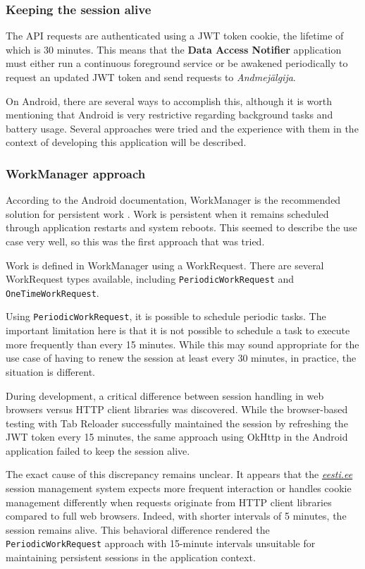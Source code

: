 \subsubsection{Keeping the session alive}
The API requests are authenticated using a JWT token cookie, the lifetime of which is 30 minutes. This means that the \textbf{Data Access Notifier} application must either run a continuous foreground service or be awakened periodically to request an updated JWT token and send requests to \textit{Andmejälgija}.

On Android, there are several ways to accomplish this, although it is worth mentioning that Android is very restrictive regarding background tasks and battery usage. Several approaches were tried and the experience with them in the context of developing this application will be described.

\subsubsection{WorkManager approach}
According to the Android documentation, WorkManager is the recommended solution for persistent work \cite{android-persistent-work}. Work is persistent when it remains scheduled through application restarts and system reboots. This seemed to describe the use case very well, so this was the first approach that was tried.

Work is defined in WorkManager using a WorkRequest. There are several WorkRequest types available, including \texttt{PeriodicWorkRequest} and \texttt{OneTimeWorkRequest}.

Using \texttt{PeriodicWorkRequest}, it is possible to schedule periodic tasks. The important limitation here is that it is not possible to schedule a task to execute more frequently than every 15 minutes. While this may sound appropriate for the use case of having to renew the session at least every 30 minutes, in practice, the situation is different.

During development, a critical difference between session handling in web browsers versus HTTP client libraries was discovered. While the browser-based testing with Tab Reloader successfully maintained the session by refreshing the JWT token every 15 minutes, the same approach using OkHttp in the Android application failed to keep the session alive.

The exact cause of this discrepancy remains unclear. It appears that the \textit{\href{https://www.eesti.ee}{eesti.ee}} session management system expects more frequent interaction or handles cookie management differently when requests originate from HTTP client libraries compared to full web browsers. Indeed, with shorter intervals of 5 minutes, the session remains alive. This behavioral difference rendered the \texttt{PeriodicWorkRequest} approach with 15-minute intervals unsuitable for maintaining persistent sessions in the application context.

